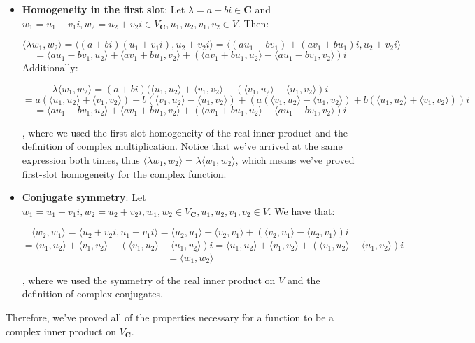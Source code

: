 \begin{solution}
\begin{itemize}
        \item \textbf{Homogeneity in the first slot}: Let $\lambda = a + bi \in \mathbf{C}$ and $w_1 = u_1 + v_1i, w_2 = u_2 + v_2i \in V_\mathbf{C}, u_1, u_2, v_1, v_2 \in V$. Then:

        $$\langle \lambda w_1, w_2 \rangle = \langle (a + bi)(u_1 + v_1i), u_2 + v_2i \rangle = \langle (au_1 - bv_1) + (av_1 + bu_1)i, u_2 + v_2i \rangle$$
        $$= \langle au_1 - bv_1, u_2 \rangle + \langle av_1 + bu_1, v_2 \rangle + (\langle av_1 + bu_1, u_2 \rangle - \langle au_1 - bv_1, v_2 \rangle)i $$
        Additionally:

        $$\lambda \langle w_1, w_2 \rangle = (a + bi)(\langle u_1, u_2 \rangle + \langle v_1, v_2 \rangle +(\langle v_1, u_2 \rangle - \langle u_1, v_2 \rangle)i$$
        $$= a(\langle u_1, u_2 \rangle + \langle v_1, v_2 \rangle) - b(\langle v_1, u_2 \rangle - \langle u_1, v_2 \rangle) + (a(\langle v_1, u_2 \rangle - \langle u_1, v_2 \rangle) + b(\langle u_1, u_2 \rangle + \langle v_1, v_2 \rangle))i$$
        $$= \langle a u_1 - bv_1, u_2 \rangle + \langle av_1 + bu_1, v_2 \rangle + (\langle a v_1 + bu_1, u_2 \rangle -\langle au_1 - bv_1, v_2 \rangle)i$$

        , where we used the first-slot homogeneity of the real inner product and the definition of complex multiplication. Notice that we've arrived at the same expression both times, thus $\langle \lambda w_1, w_2 \rangle = \lambda \langle w_1, w_2 \rangle$, which means we've proved first-slot homogeneity for the complex function.

        \item \textbf{Conjugate symmetry}: Let $w_1 = u_1 + v_1i, w_2 = u_2 + v_2i, w_1, w_2 \in V_\mathbf{C}, u_1, u_2, v_1, v_2 \in V$. We have that:

        $$\langle w_2, w_1 \rangle = \langle u_2 + v_2i, u_1 + v_1i \rangle = \langle u_2, u_1 \rangle + \langle v_2, v_1 \rangle +(\langle v_2, u_1 \rangle - \langle u_2, v_1 \rangle)i $$
        $$= \langle u_1, u_2 \rangle + \langle v_1, v_2 \rangle - (\langle v_1, u_2 \rangle - \langle u_1, v_2 \rangle)i = \overline{\langle u_1, u_2 \rangle + \langle v_1, v_2 \rangle + (\langle v_1, u_2 \rangle - \langle u_1, v_2 \rangle)i}$$
        $$=\overline{\langle w_1, w_2 \rangle}$$

        , where we used the symmetry of the real inner product on $V$ and the definition of complex conjugates.
    \end{itemize}

    Therefore, we've proved all of the properties necessary for a function to be a complex inner product on $V_\mathbf{C}$.
\end{solution}

